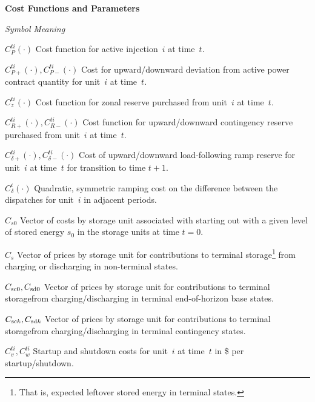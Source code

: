 \documentclass[12pt]{article}
\newcommand{\namelistlabel}[1]{\mbox{#1}\hfil}
\newenvironment{namelist}[1]{%
\begin{list}{}
  {
    \let\makelabel\namelistlabel
    \settowidth{\labelwidth}{#1}
    \setlength{\leftmargin}{1.1\labelwidth}
  }
 }{%
\end{list}}
\numberwithin{equation}{section}
\numberwithin{table}{section}
\numberwithin{figure}{section}
\begin{document}
\begin{namelist}{XXXXXXXXXX}
\item[]
\item[{\bf Cost Functions and Parameters}]
\item[\emph{Symbol}] \emph{Meaning}
\item[$C_P^{ti}(\cdot)$] Cost function for active injection~$i$ at time~$t$.
\item[$C_{P+}^{ti}(\cdot), C_{P-}^{ti}(\cdot)$] Cost for upward/downward deviation from active power contract quantity for unit~$i$ at time~$t$.
\item[$C_z^{ti}(\cdot)$] Cost function for zonal reserve purchased from unit~$i$ at time~$t$.
\item[$C_{R+}^{ti}(\cdot), C_{R-}^{ti}(\cdot)$] Cost function for upward/downward contingency reserve purchased from unit~$i$ at time~$t$.
\item[$C_{\delta+}^{ti}(\cdot),C_{\delta-}^{ti}(\cdot)$] Cost of upward/downward load-following ramp reserve for unit~$i$ at time~$t$ for transition to time $t+1$.
\item[$C_\delta^i(\cdot)$] Quadratic, symmetric ramping cost on the difference between the dispatches for unit~$i$ in adjacent periods.
\item[$C_{s0}$] Vector of costs by storage unit associated with starting out with a given level of stored energy $s_0$ in the storage units at time $t=0$.
\item[$C_{s}$] Vector of prices by storage unit for contributions to terminal storage\footnote{That is, expected leftover stored energy in terminal states.}  from charging or discharging in non-terminal states.
\item[$C_{\rm sc0}, C_{\rm sd0}$] Vector of prices by storage unit for contributions to terminal storage\footnotemark[\value{footnote}] from charging/discharging in terminal end-of-horizon base states.
\item[$C_{{\rm sc}k}, C_{{\rm sd}k}$] Vector of prices by storage unit for contributions to terminal storage\footnotemark[\value{footnote}] from charging/discharging in terminal contingency states.
\item[$C_v^{ti}, C_w^{ti}$] Startup and shutdown costs for unit~$i$ at time~$t$ in \$ per startup/shutdown.


\end{namelist}
\end{document}
